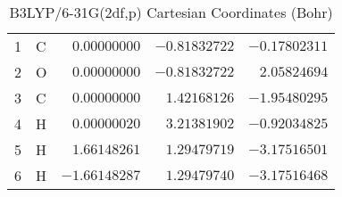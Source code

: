 \documentclass[10pt,oneside]{article}
\begin{document}
\begin{table}[h]
\centering
\caption{B3LYP/6-31G(2df,p) Cartesian Coordinates (Bohr)}
\begin{tabular}{llrrr}
\toprule
1  & C  & $ 0.00000000$ & $-0.81832722$ & $-0.17802311$ \\
2  & O  & $ 0.00000000$ & $-0.81832722$ & $ 2.05824694$ \\
3  & C  & $ 0.00000000$ & $ 1.42168126$ & $-1.95480295$ \\
4  & H  & $ 0.00000020$ & $ 3.21381902$ & $-0.92034825$ \\
5  & H  & $ 1.66148261$ & $ 1.29479719$ & $-3.17516501$ \\
6  & H  & $-1.66148287$ & $ 1.29479740$ & $-3.17516468$ \\
\bottomrule
\end{tabular}
\end{table}
\end{document}

